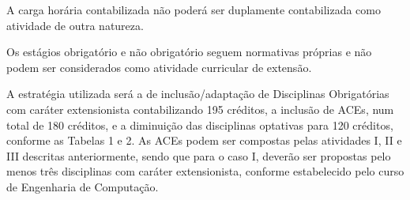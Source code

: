 \bigskip

A carga horária contabilizada não poderá ser duplamente contabilizada como atividade de outra natureza.


\bigskip

Os estágios obrigatório e não obrigatório seguem normativas próprias e não podem ser considerados como atividade
curricular de extensão.


\bigskip



A estratégia utilizada será a de inclusão/adaptação de Disciplinas Obrigatórias com caráter extensionista contabilizando
195 créditos, a inclusão de ACEs, num total de 180 créditos, e a diminuição das disciplinas optativas para 120 créditos, conforme as Tabelas 1 e 2. As ACEs podem ser compostas pelas atividades I, II e III descritas anteriormente, sendo que para o caso I, deverão ser propostas pelo menos três disciplinas com caráter extensionista, conforme estabelecido pelo curso de Engenharia de Computação.


\bigskip


